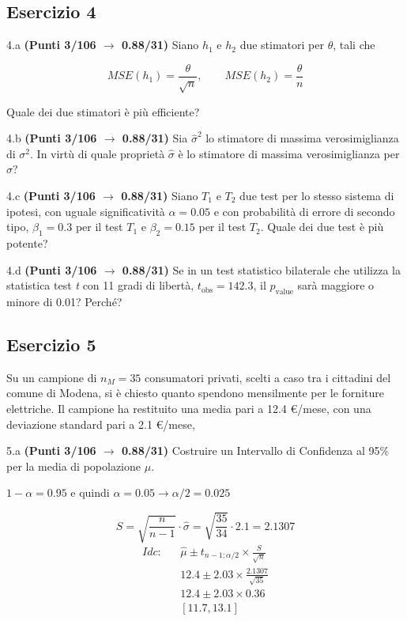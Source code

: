 \documentclass[
  11pt,
]{book}
\theoremstyle{mytheoremstyle}
\theoremstyle{mydefstyle}
\newenvironment{sol}
  {
  \begin{tcolorbox}[enhanced,breakable,arc=0.1mm,boxrule=1pt,colback=white,colframe=iblue,
  title=\bf \fontfamily{lmss}\selectfont \hspace{.5 cm} Soluzione,drop fuzzy shadow]

}{
\end{tcolorbox}
  }
\begin{document}
\subsection{Esercizio 4}\label{esercizio-4-17}

4.a \textbf{(Punti 3/106 \(\rightarrow\) 0.88/31)} Siano \(h_1\) e \(h_2\) due stimatori per \(\theta\), tali che

\[
  MSE(h_1) =  \frac{\theta}{\sqrt{n}}, \qquad  MSE(h_2) =  \frac{\theta}{n}
\]

Quale dei due stimatori è più efficiente?

4.b \textbf{(Punti 3/106 \(\rightarrow\) 0.88/31)} Sia \(\hat\sigma^2\) lo stimatore di massima verosimiglianza
di \(\sigma^2\). In virtù di quale proprietà \(\hat \sigma\) è lo stimatore di
massima verosimiglianza per \(\sigma\)?

4.c \textbf{(Punti 3/106 \(\rightarrow\) 0.88/31)} Siano \(T_1\) e \(T_2\) due test per lo stesso sistema di ipotesi,
con uguale significatività \(\alpha=0.05\) e con probabilità di errore di secondo tipo, \(\beta_1=0.3\)
per il test \(T_1\) e \(\beta_2=0.15\) per il test \(T_2\). Quale dei due test è più potente?

4.d \textbf{(Punti 3/106 \(\rightarrow\) 0.88/31)} Se in un test statistico bilaterale che utilizza
la statistica test \emph{t} con 11 gradi di libertà, \(t_\text{obs}=142.3\),
il \(p_\text{value}\) sarà maggiore o minore di 0.01? Perché?

\subsection{Esercizio 5}\label{esercizio-5-15}

Su un campione di \(n_M=35\) consumatori privati, scelti a caso tra i cittadini del comune di Modena,
si è chiesto quanto spendono mensilmente per le forniture elettriche.
Il campione ha restituito una media pari a 12.4 €/mese, con una deviazione standard pari a 2.1 €/mese,

5.a \textbf{(Punti 3/106 \(\rightarrow\) 0.88/31)} Costruire un Intervallo di Confidenza al 95\% per la media di popolazione \(\mu\).

\begin{sol}
\(1-\alpha =0.95\) e quindi \(\alpha=0.05\rightarrow \alpha/2=0.025\)

\[
      S  =\sqrt{\frac {n}{n-1}}\cdot\hat\sigma =
     \sqrt{\frac { 35 }{ 34 }}\cdot 2.1 = 2.1307 
\]
\begin{eqnarray*}
  Idc: & &  \hat\mu \pm  t_{n-1;\alpha/2} \times \frac{S}{\sqrt{n}} \\
     & &  12.4 \pm  2.03 \times \frac{ 2.1307 }{\sqrt{ 35 }} \\
     & &  12.4 \pm  2.03 \times  0.36 \\
     & & [ 11.7 ,  13.1 ]
\end{eqnarray*}

\end{sol}
\end{document}
